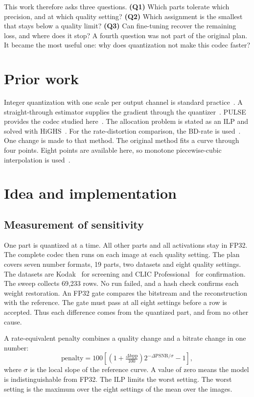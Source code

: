 \documentclass[10pt,twocolumn]{article}
\begin{document}
This work therefore asks three questions.
\textbf{(Q1)} Which parts tolerate which precision, and at which quality setting?
\textbf{(Q2)} Which assignment is the smallest that stays below a quality limit?
\textbf{(Q3)} Can fine-tuning recover the remaining loss, and where does it stop?
A fourth question was not part of the original plan. It became the most useful one: why does quantization not make
this codec faster?

\section{Prior work}
Integer quantization with one scale per output channel is standard practice~\cite{jacob}. A
straight-through estimator supplies the gradient through the quantizer~\cite{bengio}. PULSE provides the
codec studied here~\cite{pulse}. The allocation problem is stated as an ILP and solved with
HiGHS~\cite{highs}.
For the rate-distortion comparison, the BD-rate is used~\cite{bjontegaard}. One change is made to that
method. The original method fits a curve through four points. Eight points are available here, so
monotone piecewise-cubic interpolation is used~\cite{pchip}.

\section{Idea and implementation}
\subsection{Measurement of sensitivity}
One part is quantized at a time. All other parts and all activations stay in FP32. The complete codec
then runs on each image at each quality setting.
The plan covers seven number formats, 19 parts, two datasets and eight quality settings. The datasets
are Kodak~\cite{kodak} for screening and CLIC Professional~\cite{clic} for confirmation. The sweep collects
69,233 rows. No run failed, and a hash check confirms each weight restoration.
An FP32 gate compares the bitstream and the reconstruction with the reference. The gate must pass at
all eight settings before a row is accepted. Thus each difference comes from the quantized part, and from
no other cause.

A rate-equivalent penalty combines a quality change and a bitrate change in one number:
\begin{equation}
\text{penalty}=100\left[\left(1+\tfrac{\Delta\text{bpp}}{100}\right)2^{-\Delta\text{PSNR}/\sigma}-1\right],
\end{equation}
where $\sigma$ is the local slope of the reference curve. A value of zero means the model is
indistinguishable from FP32. The ILP limits the worst setting. The worst setting is the maximum over
the eight settings of the mean over the images.
\end{document}

